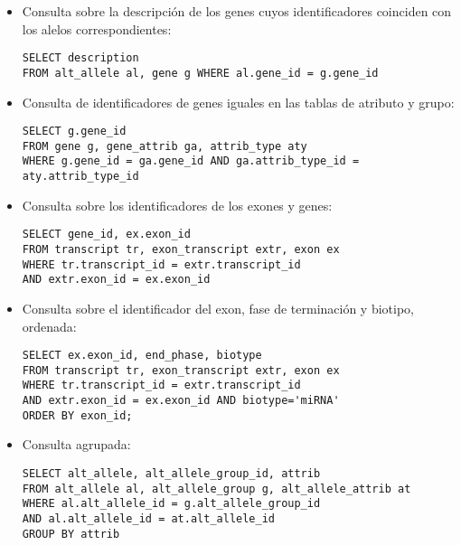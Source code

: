 \documentclass[12pt,a4paper]{article}
\begin{document}
\begin{itemize}

\item Consulta sobre la descripción de los genes cuyos identificadores coinciden con los alelos correspondientes:
\begin{verbatim} 
SELECT description
FROM alt_allele al, gene g WHERE al.gene_id = g.gene_id
\end{verbatim}

\item Consulta de identificadores de genes iguales en las tablas de atributo y grupo:
\begin{verbatim} 
SELECT g.gene_id
FROM gene g, gene_attrib ga, attrib_type aty
WHERE g.gene_id = ga.gene_id AND ga.attrib_type_id = aty.attrib_type_id
\end{verbatim}


\item Consulta sobre los identificadores de los exones y genes:
\begin{verbatim} 
SELECT gene_id, ex.exon_id
FROM transcript tr, exon_transcript extr, exon ex
WHERE tr.transcript_id = extr.transcript_id 
AND extr.exon_id = ex.exon_id

\end{verbatim}


\item  Consulta sobre el identificador del exon, fase de terminación y biotipo, ordenada:
\begin{verbatim} 
SELECT ex.exon_id, end_phase, biotype
FROM transcript tr, exon_transcript extr, exon ex
WHERE tr.transcript_id = extr.transcript_id 
AND extr.exon_id = ex.exon_id AND biotype='miRNA'
ORDER BY exon_id;
\end{verbatim}


\item Consulta agrupada:
\begin{verbatim} 
SELECT alt_allele, alt_allele_group_id, attrib
FROM alt_allele al, alt_allele_group g, alt_allele_attrib at
WHERE al.alt_allele_id = g.alt_allele_group_id 
AND al.alt_allele_id = at.alt_allele_id 
GROUP BY attrib
\end{verbatim}


\end{itemize}



\end{document}
